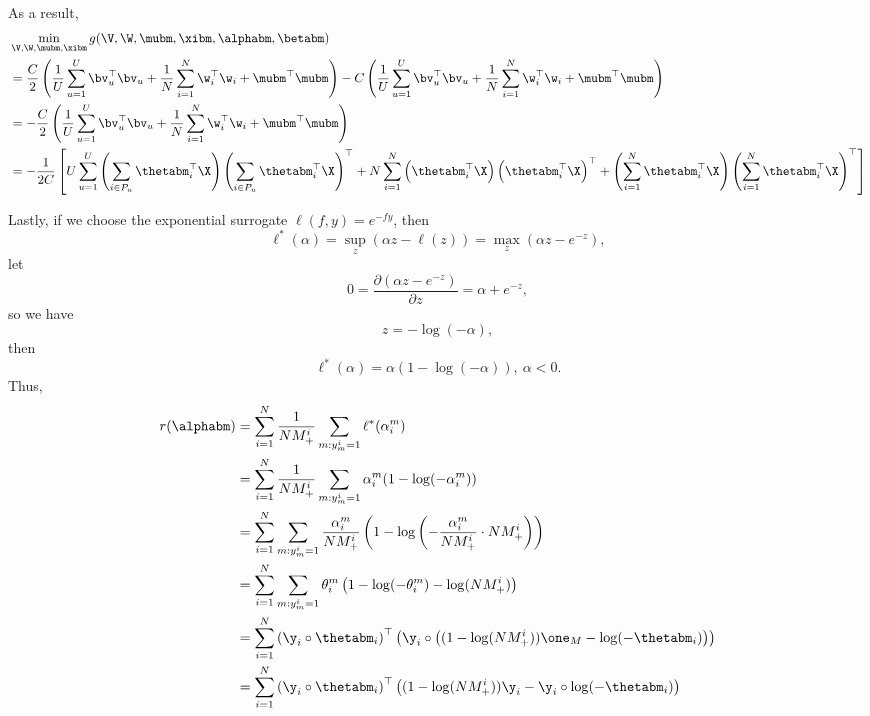 As a result,
\begin{equation}
\label{eq:gmin}
\begin{aligned}
&\min_{\V, \W, \mubm, \xibm} g(\V, \W, \mubm, \xibm, \alphabm, \betabm) \\
&= \frac{C}{2} \left( \frac{1}{U} \sum_{u=1}^U \bv_u^\top \bv_u 
     + \frac{1}{N} \sum_{i=1}^N \w_i^\top \w_i + \mubm^\top \mubm \right)
     -C \left( \frac{1}{U} \sum_{u=1}^U \bv_u^\top \bv_u + \frac{1}{N} \sum_{i=1}^N \w_i^\top \w_i + \mubm^\top \mubm \right) \\
&= -\frac{C}{2} \left( \frac{1}{U} \sum_{u=1}^U \bv_u^\top \bv_u + \frac{1}{N} \sum_{i=1}^N \w_i^\top \w_i + \mubm^\top \mubm \right) \\
&= -\frac{1}{2 C} \left[
     U \sum_{u=1}^U \left( \sum_{i \in P_u} \thetabm_i^\top \X \right) \left( \sum_{i \in P_u} \thetabm_i^\top \X \right)^\top
   + N \sum_{i=1}^N \left( \thetabm_i^\top \X \right) \left( \thetabm_i^\top \X \right)^\top
   + \left( \sum_{i=1}^N \thetabm_i^\top \X \right) \left( \sum_{i=1}^N \thetabm_i^\top \X \right)^\top \right]
\end{aligned}
\end{equation}

Lastly, if we choose the exponential surrogate $\ell(f, y) = e^{-fy}$, then
\begin{equation*}
\ell^*(\alpha) = \sup_z \left(\alpha z - \ell(z) \right) = \max_z \left(\alpha z - e^{-z} \right),
\end{equation*}
let 
\begin{equation*}
0 = \frac{\partial (\alpha z - e^{-z})}{\partial z} = \alpha + e^{-z},
\end{equation*}
so we have
\begin{equation*}
z = -\log(-\alpha),
\end{equation*}
then
\begin{equation*}
\ell^*(\alpha) = \alpha ( 1 - \log(-\alpha) ), \ \alpha < 0.
\end{equation*}
Thus,
\begin{equation}
\label{eq:expconj}
\begin{aligned}
r(\alphabm)
&= \sum_{i=1}^N \frac{1}{N M_+^i} \sum_{m: y_m^i = 1} \ell^*(\alpha_i^m) \\
&= \sum_{i=1}^N \frac{1}{N M_+^i} \sum_{m: y_m^i = 1} \alpha_i^m (1 - \log(-\alpha_i^m)) \\
&= \sum_{i=1}^N \sum_{m: y_m^i = 1} \frac{\alpha_i^m}{N M_+^i} \left(1 - \log \left( -\frac{\alpha_i^m}{N M_+^i} \cdot N M_+^i \right) \right) \\
&= \sum_{i=1}^N \sum_{m: y_m^i = 1} \theta_i^m \left(1 - \log(-\theta_i^m) - \log(N M_+^i) \right) \\
&= \sum_{i=1}^N \left( \y_i \circ \thetabm_i \right)^\top 
                \left( \y_i \circ \left( (1 - \log(N M_+^i)) \one_M - \log(-\thetabm_i) \right) \right) \\
&= \sum_{i=1}^N \left( \y_i \circ \thetabm_i \right)^\top 
                \left( (1 - \log(N M_+^i)) \y_i - \y_i \circ \log(-\thetabm_i) \right)
\end{aligned}
\end{equation}

